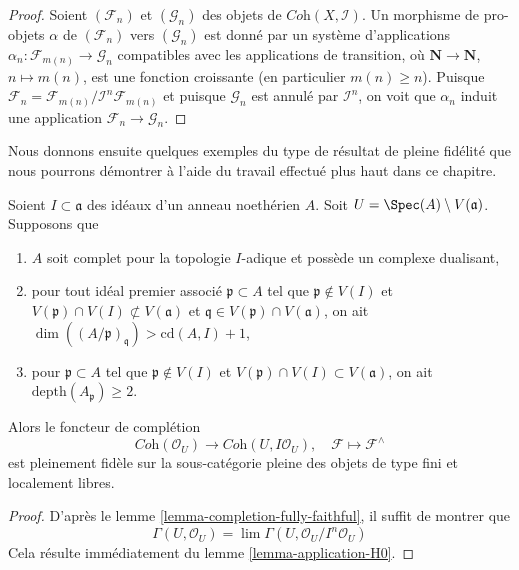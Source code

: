 \begin{proof}
Soient $(\mathcal{F}_n)$ et $(\mathcal{G}_n)$ des objets de
$\textit{Coh}(X, \mathcal{I})$. Un morphisme de pro-objets
$\alpha$ de $(\mathcal{F}_n)$ vers $(\mathcal{G}_n)$ est donné
par un système d'applications
$\alpha_n : \mathcal{F}_{m(n)} \to \mathcal{G}_n$ compatibles avec
les applications de transition, où $\mathbf{N} \to \mathbf{N}$, $n \mapsto m(n)$,
est une fonction croissante (en particulier $m(n) \geq n$). Puisque
$\mathcal{F}_n = \mathcal{F}_{m(n)}/\mathcal{I}^n\mathcal{F}_{m(n)}$
et puisque $\mathcal{G}_n$ est annulé par $\mathcal{I}^n$,
on voit que $\alpha_n$ induit une application $\mathcal{F}_n \to \mathcal{G}_n$.
\end{proof}

\noindent
Nous donnons ensuite quelques exemples du type de résultat de pleine fidélité
que nous pourrons démontrer à l'aide du travail effectué plus haut dans ce chapitre.

\begin{lemma}
\label{lemma-fully-faithful}
Soient $I \subset \mathfrak a$ des idéaux d'un anneau noethérien $A$.
Soit $U = \Spec(A) \setminus V(\mathfrak a)$. Supposons que
\begin{enumerate}
\item $A$ soit complet pour la topologie $I$-adique et possède un complexe dualisant,
\item pour tout idéal premier associé $\mathfrak p \subset A$ tel que
$\mathfrak p \not \in V(I)$ et
$V(\mathfrak p) \cap V(I) \not \subset V(\mathfrak a)$ et
$\mathfrak q \in V(\mathfrak p) \cap V(\mathfrak a)$, on ait
$\dim((A/\mathfrak p)_\mathfrak q) > \text{cd}(A, I) + 1$,
\item pour $\mathfrak p \subset A$ tel que $\mathfrak p \not \in V(I)$
et $V(\mathfrak p) \cap V(I) \subset V(\mathfrak a)$,
on ait $\text{depth}(A_\mathfrak p) \geq 2$.
\end{enumerate}
Alors le foncteur de complétion
$$
\textit{Coh}(\mathcal{O}_U)
\longrightarrow
\textit{Coh}(U, I\mathcal{O}_U),
\quad
\mathcal{F} \longmapsto \mathcal{F}^\wedge
$$
est pleinement fidèle sur la sous-catégorie pleine des
objets de type fini et localement libres.
\end{lemma}

\begin{proof}
D'après le lemme \ref{lemma-completion-fully-faithful},
il suffit de montrer que
$$
\Gamma(U, \mathcal{O}_U) =
\lim \Gamma(U, \mathcal{O}_U/I^n\mathcal{O}_U)
$$
Cela résulte immédiatement du
lemme \ref{lemma-application-H0}.
\end{proof}


